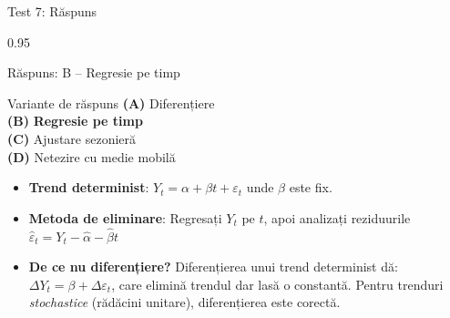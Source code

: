 \documentclass[9pt, aspectratio=169, t]{beamer}
\begin{document}
\begin{frame}{Test 7: Răspuns}
    \begin{cminipage}{0.95\textwidth}
    \begin{exampleblock}{Răspuns: B -- Regresie pe timp}
    {\small
        \begin{block}{Variante de răspuns}
            \textcolor{MainBlue}{\textbf{(A)}} Diferențiere \incorrect\\[3pt]
            \textcolor{MainBlue}{\textbf{(B)}} \textbf{\textcolor{Forest}{Regresie pe timp}} \correct\\[3pt]
            \textcolor{MainBlue}{\textbf{(C)}} Ajustare sezonieră \incorrect\\[3pt]
            \textcolor{MainBlue}{\textbf{(D)}} Netezire cu medie mobilă \incorrect
        \end{block}

        \vspace{0.1cm}

        \begin{itemize}\setlength{\itemsep}{0pt}
            \item \textbf{Trend determinist}: $Y_t = \alpha + \beta t + \varepsilon_t$ unde $\beta$ este fix.
            \item \textbf{Metoda de eliminare}: Regresați $Y_t$ pe $t$, apoi analizați reziduurile $\hat{\varepsilon}_t = Y_t - \hat{\alpha} - \hat{\beta}t$
            \item \textbf{De ce nu diferențiere?} Diferențierea unui trend determinist dă: $\Delta Y_t = \beta + \Delta\varepsilon_t$, care elimină trendul dar lasă o constantă. Pentru trenduri \textit{stochastice} (rădăcini unitare), diferențierea este corectă.
        \end{itemize}
    }
    \end{exampleblock}
    \end{cminipage}
\end{frame}
\end{document}
